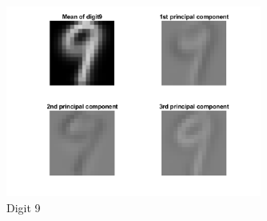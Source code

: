 \documentclass[12pt]{article}
\begin{document}
\begin{figure}[H]
\begin{center}
    \caption{Digit 9}
    \includegraphics[width=0.75\textwidth]{images/digit9.png}
\end{center}
\end{figure}
\end{document}
